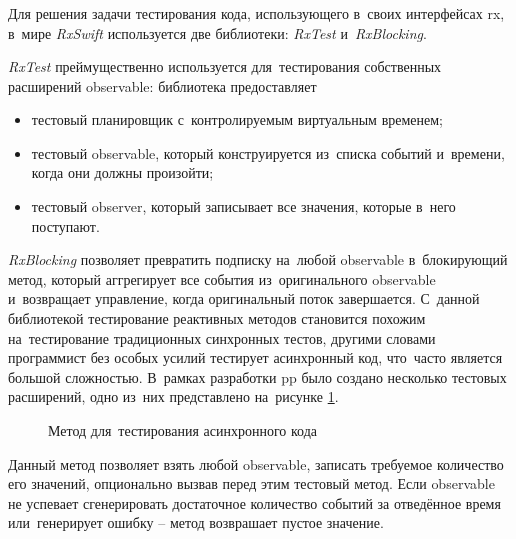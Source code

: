 \subsubsection{}
\label{sec:testing:tech:rx}

Для решения задачи тестирования кода, использующего в~своих интерфейсах \gls{rx}, в~мире \textit{RxSwift} используется две библиотеки: \textit{RxTest} и~\textit{RxBlocking}.

\textit{RxTest} преймущественно используется для~тестирования собственных расширений \gls{observable}: библиотека предоставляет

\begin{itemize}
	\item тестовый планировщик с~контролируемым виртуальным временем;
	\item тестовый \gls{observable}, который конструируется из~списка событий и~времени, когда они должны произойти;
	\item тестовый \gls{observer}, который записывает все значения, которые в~него поступают.
\end{itemize}

\textit{RxBlocking} позволяет превратить подписку на~любой \gls{observable} в~блокирующий метод, который аггрегирует все события из~оригинального \gls{observable} и~возвращает управление, когда оригинальный поток завершается. С~данной библиотекой тестирование реактивных методов становится похожим на~тестирование традиционных синхронных тестов, другими словами программист без особых усилий тестирует асинхронный код, что~часто является большой сложностью. В~рамках разработки \gls{pp} было создано несколько тестовых расширений, одно из~них представлено на~рисунке \ref{sec:testing:tech:rx:testasync}.

\begin{figure}[h]
  
   \caption{Метод для~тестирования асинхронного кода}
   \label{sec:testing:tech:rx:testasync}
\end{figure}

Данный метод позволяет взять любой \gls{observable}, записать требуемое количество его значений, опционально вызвав перед этим тестовый метод. Если \gls{observable} не успевает сгенерировать достаточное количество событий за отведённое время или~генерирует ошибку -- метод возврашает пустое значение.